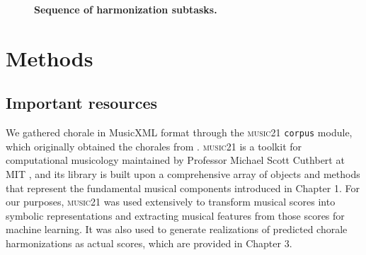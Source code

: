 \documentclass[11pt]{article}
\begin{document}
\begin{figure}[h]
\begin{center}
\caption{\textbf{Sequence of harmonization subtasks.}}
\end{center}
\end{figure}


\section{Methods}

\subsection{Important resources}

We gathered chorale in MusicXML format through the \textsc{music21} \texttt{corpus} module, which originally obtained the chorales from \citet{greentree2005}. \textsc{music21} is a toolkit for computational musicology maintained by Professor Michael Scott Cuthbert at MIT \citep{cuthbertmusic21}, and its library is built upon a comprehensive array of objects and methods that represent the fundamental musical components introduced in Chapter 1. For our purposes, \textsc{music21} was used extensively to transform musical scores into symbolic representations and extracting musical features from those scores for machine learning. It was also used to generate realizations of predicted chorale harmonizations as actual scores, which are provided in Chapter 3. \\
\end{document}
